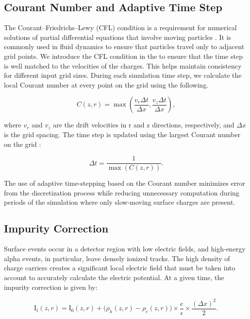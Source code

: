 \subsection{Courant Number and Adaptive Time Step}

The Courant–Friedrichs–Lewy (CFL) condition is a requirement for numerical solutions of partial differential equations that involve moving particles \cite{cfl_condition}. It is commonly used in fluid dynamics to ensure that particles travel only to adjacent grid points. We introduce the CFL condition in the {\ehd} to ensure that the time step is well matched to the velocities of the charges. This helps maintain consistency for different input grid sizes. During each simulation time step, we calculate the local Courant number at every point on the grid using the following.

\begin{equation}
C(z,r) = \max \left( \frac{v_r \Delta t}{\Delta x}, \frac{v_z \Delta t}{\Delta x} \right),
\end{equation}

\noindent
where \( v_r \) and \( v_z \) are the drift velocities in r and z directions, respectively, and  \( \Delta x \) is the grid spacing. The time step is updated using the largest Courant number on the grid :

\begin{equation}
\Delta t = \frac{1}{\max (C(z,r))}.
\end{equation}

The use of adaptive time-stepping based on the Courant number minimizes error from the discretization process while reducing unnecessary computation during periods of the simulation where only slow-moving surface charges are present.

\subsection{Impurity Correction}

Surface events occur in a detector region with low electric fields, and high-energy alpha events, in particular, leave densely ionized tracks. The high density of charge carriers creates a significant local electric field that must be taken into account to accurately calculate the electric potential. At a given time, the impurity correction is given by:

\begin{equation}
  {\text{I}_{t}}(z, r) = \text{I}_{0}(z, r) +
  \bigl( \rho_h(z, r) - \rho_e(z, r) \bigr) \times \frac{e}{\epsilon} \times \frac{(\Delta x)^2}{2}.
\end{equation}

